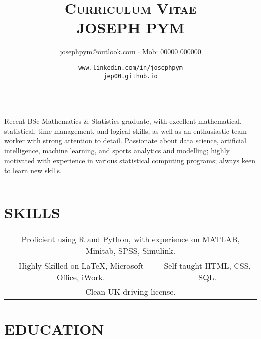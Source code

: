 \documentclass[9pt,a4paper]{article}
\title{\scshape{Curriculum Vitae}\\JOSEPH PYM}\author{josephpym@outlook.com $\cdot$ Mob: 00000 000000}\date{\texttt{www.linkedin.com/in/josephpym} \\ \texttt{jep00.github.io}}
\begin{document}
\maketitle\setcounter{secnumdepth}{0}
\begin{center}\rule{0.5\textwidth}{0.3pt}\end{center}
\begin{center} %
\noindent Recent BSc Mathematics \& Statistics graduate, with excellent mathematical, statistical, time management, and logical skills, as well as an enthusiastic team worker with strong attention to detail. Passionate about data science, artificial intelligence, machine learning, and sports analytics and modelling; highly motivated with experience in various statistical computing programs; always keen to learn new skills.\end{center}
\begin{center}\rule{0.5\textwidth}{0.3pt}\end{center}

\section{SKILLS}
\begin{center}\begin{tabular}{cc}
\multicolumn{2}{c}{Proficient using R and Python, with experience on MATLAB, Minitab, SPSS, Simulink.}\\
Highly Skilled on \LaTeX, Microsoft Office, iWork. & Self-taught HTML, CSS, SQL.\\
\multicolumn{2}{c}{Clean UK driving license.}
\end{tabular}\end{center}


\section{EDUCATION}
	
\end{document}

